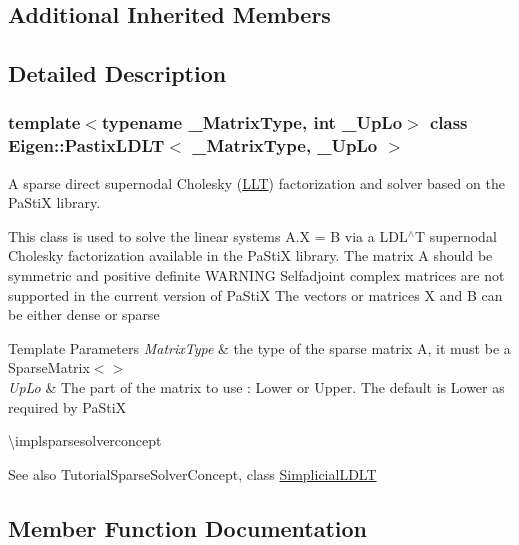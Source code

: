 \subsection*{Additional Inherited Members}


\subsection{Detailed Description}
\subsubsection*{template$<$typename \+\_\+\+Matrix\+Type, int \+\_\+\+Up\+Lo$>$\newline
class Eigen\+::\+Pastix\+L\+D\+L\+T$<$ \+\_\+\+Matrix\+Type, \+\_\+\+Up\+Lo $>$}

A sparse direct supernodal Cholesky (\mbox{\hyperlink{class_eigen_1_1_l_l_t}{L\+LT}}) factorization and solver based on the Pa\+StiX library. 

This class is used to solve the linear systems A.\+X = B via a L\+D\+L$^\wedge$T supernodal Cholesky factorization available in the Pa\+StiX library. The matrix A should be symmetric and positive definite W\+A\+R\+N\+I\+NG Selfadjoint complex matrices are not supported in the current version of Pa\+StiX The vectors or matrices X and B can be either dense or sparse


\begin{DoxyTemplParams}{Template Parameters}
{\em Matrix\+Type} & the type of the sparse matrix A, it must be a Sparse\+Matrix$<$$>$ \\
\hline
{\em Up\+Lo} & The part of the matrix to use \+: Lower or Upper. The default is Lower as required by Pa\+StiX\\
\hline
\end{DoxyTemplParams}
\textbackslash{}implsparsesolverconcept

\begin{DoxySeeAlso}{See also}
Tutorial\+Sparse\+Solver\+Concept, class \mbox{\hyperlink{class_eigen_1_1_simplicial_l_d_l_t}{Simplicial\+L\+D\+LT}} 
\end{DoxySeeAlso}


\subsection{Member Function Documentation}
\mbox{\label{class_eigen_1_1_pastix_l_d_l_t_a01947862303ca404b9ce5033751a221b}} 
